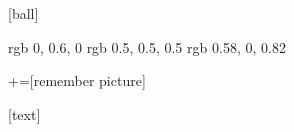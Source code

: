 \batchmode
[ball]

\usepackage[utf8]{inputenc}
\usepackage{graphicx}
\usepackage{MnSymbol}

\usepackage{smartdiagram}

\usepackage{media9}
\usetikzlibrary{arrows, shapes}
\usepackage{stmaryrd}
\usepackage{colortbl}
\usepackage{caption}
\usepackage{comment}
\usepackage{pdfpages}
\usepackage{listings}
\usepackage{color}
\usepackage{booktabs}
\usepackage{soul}
\usepackage[normalem]{ulem}

\usepackage{tcolorbox}
\usepackage{lipsum}
\usepackage{pgf}
\usepackage{etex}

\usepackage{tikz, pgfplots}

\newenvironment{changemargin}[2]{%
  \begin{list}{}{%
    \setlength{\topsep}{0pt}%
    \setlength{\leftmargin}{#1}%
    \setlength{\rightmargin}{#2}%
    \setlength{\listparindent}{\parindent}%
    \setlength{\itemindent}{\parindent}%
    \setlength{\parsep}{\parskip}%
  }%
  \item[]}{\end{list}}

\usepackage{color}
\definecolor{dkgreen} {rgb} {0, 0.6, 0}
\definecolor{gray} {rgb} {0.5, 0.5, 0.5}
\definecolor{mauve} {rgb} {0.58, 0, 0.82}

+=[remember picture]
\everymath {\displaystyle}

\usepackage{cite}

[text]
%

\usepackage[square, numbers]{natbib} %

\hypersetup{
colorlinks=true,
linkcolor=blue,
filecolor=blue,
urlcolor=mauve,
anchorcolor=blue,
citecolor=blue,
}

